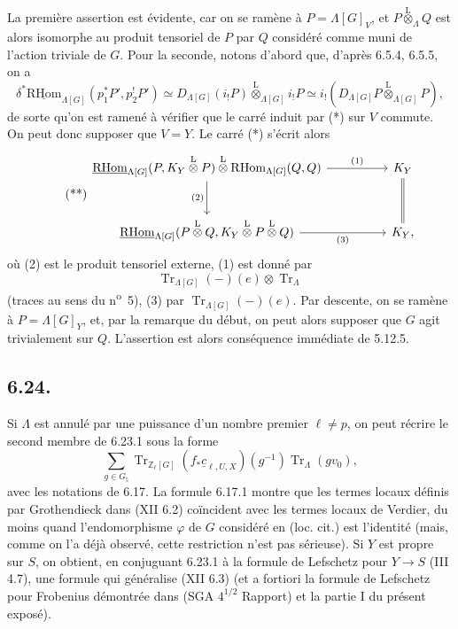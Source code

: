 \documentclass[11pt]{article}
\newcommand{\R}{\mathrm{R}}\newcommand{\RHomCore}{\mathrm{RHom}}
\providecommand{\RHom}{\RHomCore}
\providecommand{\uRHom}{\underline{\RHom}}
\providecommand{\Tr}{\operatorname{Tr}}
\providecommand{\Tr}{\operatorname{Tr}}
\providecommand{\lten}{\overset{\mathrm L}{\otimes}}
\providecommand{\Tr}{\operatorname{Tr}}
\providecommand{\RHom}{\RHomCore}
\providecommand{\lten}{\overset{\mathrm L}{\otimes}}
\providecommand{\RHom}{\R\mathcal{H}om}
\providecommand{\lten}{\overset{\mathrm L}{\otimes}}
\providecommand{\R}{\mathrm R}
\providecommand{\Tr}{\operatorname{Tr}}
\providecommand{\lten}{\overset{\mathrm L}{\otimes}}
\providecommand{\lten}{\overset{\mathrm L}{\otimes}}
\providecommand{\lten}{\overset{\mathrm L}{\otimes}}
\providecommand{\RHom}{\RHomCore}
\providecommand{\Tr}{\operatorname{Tr}}
\providecommand{\lten}{\overset{\mathrm L}{\otimes}}
\begin{document}
La première assertion est évidente, car on se ramène à $P=\Lambda[G]_V$, et $P\lten_{\Lambda}Q$ est alors isomorphe au produit tensoriel de $P$ par $Q$ considéré comme muni de l'action triviale de $G$. Pour la seconde, notons d'abord que, d'après 6.5.4, 6.5.5, on a
\[
\delta^*\uRHom_{\Lambda[G]}(p_1^*P',p_2^!P')
\simeq
D_{\Lambda[G]}(i_!P)\lten_{\Lambda[G]} i_!P
\simeq
i_!(D_{\Lambda[G]}P\lten_{\Lambda[G]}P),
\]
de sorte qu'on est ramené à vérifier que le carré induit par (*) sur $V$ commute. On peut donc supposer que $V=Y$. Le carré (*) s'écrit alors
\begin{equation}
\tag{**}
\begin{tikzcd}[column sep=huge,row sep=large]
\uRHom_{\Lambda[G]}(P,K_Y\lten P)\lten\mathrm{R}\mathrm{Hom}_{\Lambda[G]}(Q,Q)
  \arrow[r,"(1)"] \arrow[d,"(2)"']
& K_Y \arrow[d,
equal]\\
\uRHom_{\Lambda[G]}(P\lten Q,K_Y\lten P\lten Q) \arrow[r,"(3)"']
& K_Y ,
\end{tikzcd}
\end{equation}
où (2) est le produit tensoriel externe, (1) est donné par
\[
\Tr_{\Lambda[G]}(-)(e)\otimes\Tr_{\Lambda}
\]
(traces au sens du n\textsuperscript{o}~5), (3) par $\Tr_{\Lambda[G]}(-)(e)$. Par descente, on se ramène à $P=\Lambda[G]_Y$, et, par la remarque du début, on peut alors supposer que $G$ agit trivialement sur $Q$. L'assertion est alors conséquence immédiate de 5.12.5.

\subsection*{6.24.}
Si $\Lambda$ est annulé par une puissance d'un nombre premier $\ell\ne p$, on peut récrire le second membre de 6.23.1 sous la forme
\[
\sum_{g\in G_{\natural}}
\Tr_{\mathbb Z_{\ell}[G]}(f_*\underline c_{\ell,U,X})(g^{-1})
\Tr_{\Lambda}(gv_0),
\]
avec les notations de 6.17. La formule 6.17.1 montre que les termes locaux définis par Grothendieck dans (XII 6.2) coïncident avec les termes locaux de Verdier, du moins quand l'endomorphisme $\varphi$ de $G$ considéré en (loc. cit.) est l'identité (mais, comme on l'a déjà observé, cette restriction n'est pas sérieuse). Si $Y$ est propre sur $S$, on obtient, en conjuguant 6.23.1 à la formule de Lefschetz pour $Y\to S$ (III 4.7), une formule qui généralise (XII 6.3) (et a fortiori la formule de Lefschetz pour Frobenius démontrée dans (SGA $4^{1/2}$ Rapport) et la partie I du présent exposé).
\end{document}
